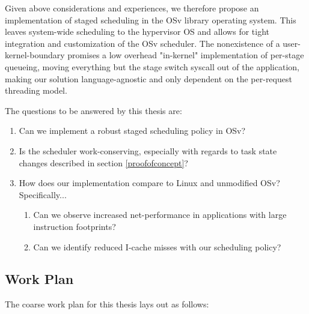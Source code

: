 \documentclass{article}
\begin{document}
Given above considerations and experiences, we therefore propose an implementation of staged scheduling in the OSv
library operating system.
This leaves system-wide scheduling to the hypervisor OS and allows for tight integration and customization of the OSv scheduler.
The nonexistence of a user-kernel-boundary promises a low overhead "in-kernel" implementation of per-stage queueing,
moving everything but the stage switch syscall out of the application,
making our solution language-agnostic and only dependent on the per-request threading model.

The questions to be answered by this thesis are:
\begin{enumerate}
    \item Can we implement a robust staged scheduling policy in OSv?
    \item Is the scheduler work-conserving, especially with regards to task state changes described in section \ref{proofofconcept}?
    \item How does our implementation compare to Linux and unmodified OSv? Specifically...
        \begin{enumerate}
            \item Can we observe increased net-performance in applications with large instruction footprints?
            \item Can we identify reduced I-cache misses with our scheduling policy?
        \end{enumerate}
\end{enumerate}

\subsection{Work Plan}

The coarse work plan for this thesis lays out as follows:
\end{document}
